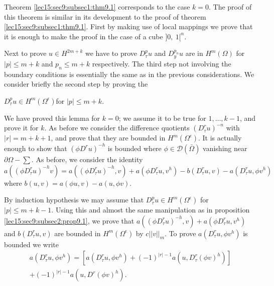 Theorem \ref{lec15:sec9:subsec1:thm9.1} corresponds to the case $k = 0$. The proof of this theorem
is similar in its development to the proof of theorem \ref{lec15:sec9:subsec1:thm9.1}. First by
making use of local mappings we prove that it is enough to make the
proof in the case of a cube $]0, ~ 1[^n$.  

Next to prove $u \in H^{2m + k}$ we have to prove $D^p_\tau u$
and $D^{p_n}_y u $ are in $H^m (\Omega )$ for $| p | \leq m+k$ and $
p_n \leq m+k$ respectively. The third step not involving the boundary
conditions is essentially the same as in the previous
considerations. We consider briefly the second step by proving the  
\begin{lemma}\label{lec17:sec9:subsec6:lem9.11}%
  $D^p_\tau u \in H^m (\Omega^\epsilon)$\pageoriginale for $| p | \leq m+k$. 
\end{lemma}

We have proved this lemma for $k = 0$; we assume it to be true for $1,
\ldots , k-1$, and prove it for $k$. As before we consider the
difference quotients $(D^r_\tau u)^{-n} $ with $| r | = m+k+1$, and
prove that they are bounded in $H^m (\Omega^\epsilon )$. It is
actually enough to show that $(\phi D^r u)^{-h}$ is bounded where
$\phi \in \mathscr{D} (\bar{\Omega})$ vanishing near $\partial
\Omega - \sum$. As before, we consider the identity  
$$
a((\phi D^r_\tau u)^{-h} v) = a((\phi D^r_\tau u)^{-h}, v) + a(\phi
D^r_\tau u, v^h) - b(D^r_\tau u, v) -a (D^r_\tau u, \phi v^h) 
$$
where $b(u, v) = a(\phi u, v) -a (u, \phi v)$. 

By induction hypothesis we may assume that $D^p_\tau u \in H^m
(\Omega^\epsilon )$ for $|p| \leq m+k-1$. Using this and almost the
same manipulation as in proposition \ref{lec15:sec9:subsec2:prop9.1}, we prove that $a((\phi
D^r_\tau u)^{-h}, v) + a (\phi D^r_\tau u, v^h) $ and $ b (D^r_\tau u,
v )$ are bounded in $H^m (\Omega^\epsilon )$ by $c|| v ||_m$. To
prove $a(D^r_\tau u, \phi v^h)$ is bounded we write  
\begin{multline*}
  a(D^r_\tau u, \phi v^h) = \left[ a(D^r_\tau u, \phi v^h) + (-1)^{|r| - 1}
    a (u, D^r_\tau (\phi v)^h) \right]\\
  + (-1)^{|r|-1} a(u, D^r (\phi v)^h). 
\end{multline*}


